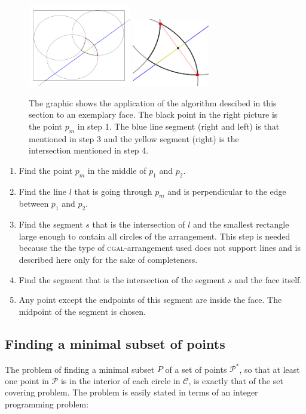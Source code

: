 \documentclass[a4paper,12pt]{article}
\begin{document}
\begin{figure}[hb]
\includegraphics[width=0.4\textwidth]{pictures/PointInFace.png}
\includegraphics[width=0.3\textwidth]{pictures/PointInFace2.png}
 \caption[Close up of \textit{Hemidactylus} sp.]
   {The graphic shows the application of the algorithm descibed in this section to an exemplary face. The black point in the right picture is the point $p_m$ in step 1. The blue line segment (right and left) is that mentioned in step 3 and the yellow segment (right) is the intersection mentioned in step 4.}
\end{figure}
\begin {enumerate}
\item
Find the point $p_m$ in the middle of $p_1$ and $p_2$.
\item
Find the line $l$ that is going through $p_m$ and is perpendicular to the edge between $p_1$ and $p_2$.
\item
Find the segment $s$ that is the intersection of $l$ and the smallest rectangle large enough to contain all circles of the arrangement. This step is needed because the the type of \textsc{cgal}-arrangement used does not support lines and is described here only for the sake of completeness.
\item
Find the segment that is the intersection of the segment $s$ and the face itself.
\item
Any point except the endpoints of this segment are inside the face. The midpoint of the segment is chosen.
\end{enumerate}

\subsection{Finding a minimal subset of points}
\label{sec:gurobi}
The problem of finding a minimal subset $P$ of a set of points $\mathcal P^*$, so that at least one point in $\mathcal P$ is in the interior of each circle in $\mathcal C$, is exactly that of the set covering problem. The problem is easily stated in terms of an integer programming problem:
\end{document}
